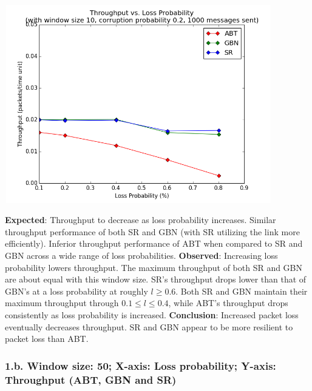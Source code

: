 \documentclass{article}
\begin{document}
\begin{center}
    \includegraphics[width=330pt,height=245pt]{images/exp1g1.png}
\end{center}

\textbf{Expected}: Throughput to decrease as loss probability increases. Similar throughput performance of both SR and GBN (with SR utilizing the link more efficiently). Inferior throughput performance of ABT when compared to SR and GBN across a wide range of loss probabilities. 
\newline\newline
\textbf{Observed}: Increasing loss probability lowers throughput. The maximum throughput of both SR and GBN are about equal with this window size. SR's throughput drops lower than that of GBN's at a loss probability at roughly $l\ge0.6$. Both SR and GBN maintain their maximum throughput through $0.1 \le l \le 0.4$, while ABT's throughput drops consistently as loss probability is increased.
\newline\newline
\textbf{Conclusion}: Increased packet loss eventually decreases throughput. SR and GBN appear to be more resilient to packet loss than ABT.

\pagebreak

\subsubsection{1.b. Window size: 50; X-axis: Loss probability; Y-axis: Throughput (ABT, GBN and SR)}
\end{document}
